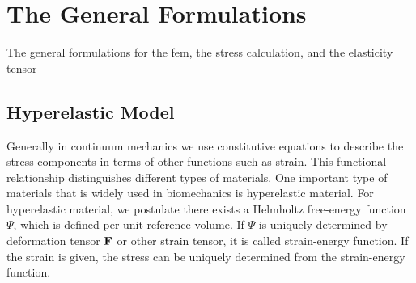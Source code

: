 \section{The General Formulations}
The general formulations for the fem, the stress calculation, and the elasticity tensor

%
\subsection{Hyperelastic Model}
Generally in continuum mechanics we use constitutive equations to describe the stress components in terms of other functions such as strain. This functional relationship distinguishes different types of materials. One important type of materials that is widely used in biomechanics is hyperelastic material. For hyperelastic material, we postulate there exists a Helmholtz free-energy function $\Psi$, which is defined per unit reference volume. If $\Psi$ is uniquely determined by deformation tensor $\bold{F}$ or other strain tensor, it is called strain-energy function. If the strain is given, the stress can be uniquely determined from the strain-energy function.  

